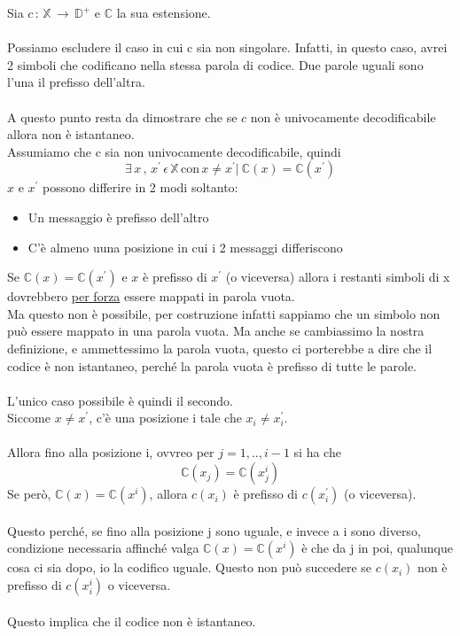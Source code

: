 \documentclass[12pt]{report}
\begin{document}
    \begin{dimo}
        Sia $c\,:\,\mathbb{X} \, \rightarrow \, \mathbb{D}^+$ e $\mathbb{C}$ la sua estensione. \\ \\
        Possiamo escludere il caso in cui c sia non singolare. Infatti, in questo caso, avrei 2 simboli che codificano nella stessa parola di codice. Due parole uguali sono l'una il prefisso dell'altra. \\ \\
        A questo punto resta da dimostrare che se $c$ non è univocamente decodificabile allora non è istantaneo. \\
        Assumiamo che c sia non univocamente decodificabile, quindi \begin{equation} \label{eq:one}
        \exists \, x \,,\,x^{'} \, \epsilon \, \mathbb{X}\, \text{con} \, x \neq x^{'} | \ \mathbb{C}(x) = \mathbb{C}(x^{'})
        \end{equation}
        $x$ e $x^{'}$ possono differire in 2 modi soltanto:
        \begin{itemize}
            \item Un messaggio è prefisso dell'altro
            \item C'è almeno uuna posizione in cui i 2 messaggi differiscono
        \end{itemize}
        Se $\mathbb{C}(x) = \mathbb{C}(x^{'})$ e $x$ è prefisso di $x^{'}$ (o viceversa) allora i restanti simboli di x dovrebbero \underline{per forza} essere mappati in parola vuota. \\ Ma questo non è possibile, per costruzione infatti sappiamo che un simbolo non può essere mappato in una parola vuota. Ma anche se cambiassimo la nostra definizione, e ammettessimo la parola vuota, questo ci porterebbe a dire che il codice è non istantaneo, perché la parola vuota è prefisso di tutte le parole.
        \\ \\
        L'unico caso possibile è quindi il secondo. \\ Siccome $x \neq x^{'}$, c'è una posizione i tale che $x_i \neq x_i^{'}$.
        \\ \\
        Allora fino alla posizione i, ovvreo per $j = 1,..,i-1$ si ha che
        $$\mathbb{C}(x_j) = \mathbb{C}(x_j^{i})$$
        Se però, $\mathbb{C}(x) = \mathbb{C}(x^{i})$, allora $c(x_i)$ è prefisso di $c(x_i^{'})$ (o viceversa). \\ \\

        \noindent Questo perché, se fino alla posizione j sono uguale, e invece a i sono diverso, condizione necessaria affinché valga  $\mathbb{C}(x) = \mathbb{C}(x^{i})$ è che da j in poi, qualunque cosa ci sia dopo, io la codifico uguale. Questo non può succedere se $c(x_i)$ non è prefisso di $c(x_i^{i})$ o viceversa.
        \\ \\
        Questo implica che il codice non è istantaneo.
    \end{dimo}
\end{document}
